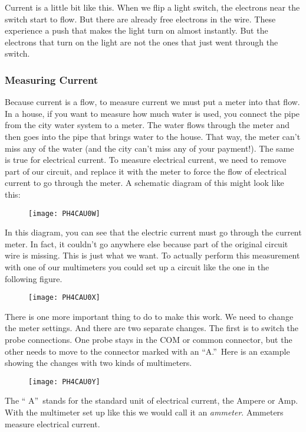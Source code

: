 Current is a little bit like this. When we flip a light switch, the
electrons near the switch start to flow. But there are already free
electrons in the wire. These experience a push that makes the light turn on
almost instantly. But the electrons that turn on the light are not the ones
that just went through the switch.

\subsubsection{Measuring Current}
\label{MeasureA}
Because current is a flow, to measure current we must put a meter into that
flow. In a house, if you want to measure how much water is used, you connect
the pipe from the city water system to a meter. The water flows through the
meter and then goes into the pipe that brings water to the house. That way,
the meter can't miss any of the water (and the city can't miss any of your
payment!). The same is true for electrical current. To measure electrical
current, we need to remove part of our circuit, and replace it with the
meter to force the flow of electrical current to go through the meter. A
schematic diagram of this might look like this: \begin{figure}[h!]
	\texttt{[image: PH4CAU0W]}
\end{figure}In this diagram, you can see that
the electric current must go through the current meter. In fact, it couldn't
go anywhere else because part of the original circuit wire is missing. This
is just what we want. To actually perform this measurement with one of our
multimeters you could set up a circuit like the one in the following figure. 
\begin{figure}[h!]
	\texttt{[image: PH4CAU0X]}
\end{figure}There is one more important thing
to do to make this work. We need to change the meter settings. And there are
two separate changes. The first is to switch the probe connections. One
probe stays in the COM or common connector, but the other needs to move to
the connector marked with an \textquotedblleft A.\textquotedblright\ Here is
an example showing the changes with two kinds of multimeters. \begin{figure}[h!]
	\texttt{[image: PH4CAU0Y]}
\end{figure}The \textquotedblleft
A\textquotedblright\ stands for the standard unit of electrical current, the
Ampere or Amp. With the multimeter set up like this we would call it an 
\emph{ammeter}. Ammeters measure electrical current.



